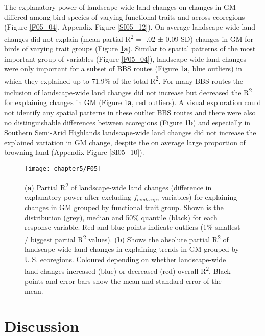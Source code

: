 The explanatory power of landscape-wide land changes on changes in GM differed among bird species of varying functional traits and across ecoregions (Figure \ref{F05_04}, Appendix Figure \ref{SI05_12}). On average landscape-wide land changes did not explain (mean partial R\textsuperscript{2} = -.02 $\pm$ 0.09 SD) changes in GM for birds of varying trait groups (Figure \ref{F05_05}\textbf{a}). Similar to spatial patterns of the most important group of variables (Figure \ref{F05_04}), landscape-wide land changes were only important for a subset of BBS routes (Figure \ref{F05_05}\textbf{a}, blue outliers) in which they explained up to 71.9\% of the total R\textsuperscript{2}. For many BBS routes the inclusion of landscape-wide land changes did not increase but decreased the R\textsuperscript{2} for explaining changes in GM (Figure \ref{F05_05}\textbf{a}, red outliers). A visual exploration could not identify any spatial patterns in these outlier BBS routes and there were also no distinguishable differences between ecoregions (Figure \ref{F05_05}\textbf{b}) and especially in Southern Semi-Arid Highlands landscape-wide land changes did not increase the explained variation in GM change, despite the on average large proportion of browning land (Appendix Figure \ref{SI05_10}).

\begin{figure}[htb]
\centering
\texttt{[image: chapter5/F05]}
\caption{(\textbf{a}) Partial R\textsuperscript{2} of landscape-wide land changes (difference in explanatory power after excluding $f_{landscape}$ variables) for explaining changes in GM grouped by functional trait group. Shown is the distribution (grey), median and 50\% quantile (black) for each response variable. Red and blue points indicate outliers (1\% smallest / biggest partial R\textsuperscript{2} values). (\textbf{b}) Shows the absolute partial R\textsuperscript{2} of landscape-wide land changes in explaining trends in GM grouped by U.S. ecoregions. Coloured depending on whether landscape-wide land changes increased (blue) or decreased (red) overall R\textsuperscript{2}. Black points and error bars show the mean and standard error of the mean.}
\label{F05_05}
\end{figure}

\section{Discussion}
\label{C05_04}

